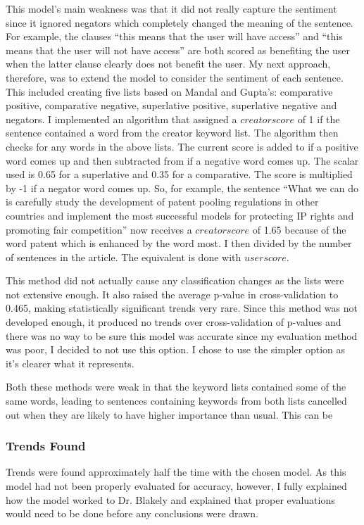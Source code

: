			This model's main weakness was that it did not really capture the sentiment since it ignored negators which completely changed the meaning of the sentence. For example, the clauses “this means that the user will have access” and “this means that the user will not have access” are both scored as benefiting the user when the latter clause clearly does not benefit the user. My next approach, therefore, was to extend the model to consider the sentiment of each sentence. This included creating five lists based on Mandal and Gupta's\cite{lexicon_sentiments_mandal}: comparative positive, comparative negative, superlative positive, superlative negative and negators. I implemented an algorithm that assigned a $creatorscore$ of 1 if the sentence contained a word from the creator keyword list. The algorithm then checks for any words in the above lists. The current score is added to if a positive word comes up and then subtracted from if a negative word comes up. The scalar used is 0.65 for a superlative and 0.35 for a comparative. The score is multiplied by -1 if a negator word comes up. So, for example, the sentence ``What we can do is carefully study the development of patent pooling regulations in other countries and implement the most successful models for protecting IP rights and promoting fair competition'' now receives a $creatorscore$ of 1.65 because of the word patent which is enhanced by the word most. I then divided by the number of sentences in the article. The equivalent is done with $userscore$.
			
			This method did not actually cause any classification changes as the lists were not extensive enough. It also raised the average p-value in cross-validation to 0.465, making statistically significant trends very rare. Since this method was not developed enough, it produced no trends over cross-validation of p-values and there was no way to be sure this model was accurate since my evaluation method was poor, I decided to not use this option. I chose to use the simpler option as it's clearer what it represents.
			
			Both these methods were weak in that the keyword lists contained some of the same words, leading to sentences containing keywords from both lists cancelled out when they are likely to have higher importance than usual. This can be 
		\subsubsection{Trends Found}
			Trends were found approximately half the time with the chosen model. As this model had not been properly evaluated for accuracy, however, I fully explained how the model worked to Dr. Blakely and explained that proper evaluations would need to be done before any conclusions were drawn.
